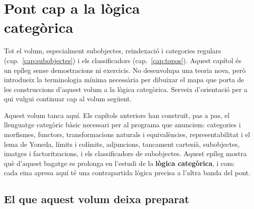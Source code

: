 \chapter[Pont cap a la lògica categòrica]{\texorpdfstring{Pont cap a la lògica\\ categòrica}{Pont cap a la lògica categòrica}}
\label{cap:pont}

\begin{objectius}
 Tot el volum, especialment subobjectes, reindexació i categories regulars (cap.~\ref{cap:subobjectes}) i els classificadors (cap.~\ref{cap:topos}).
 Aquest capítol és un epíleg sense demostracions ni exercicis. No desenvolupa una teoria nova, però introdueix la terminologia mínima necessària per dibuixar el mapa que porta de les construccions d'aquest volum a la lògica categòrica. Serveix d'orientació per a qui vulgui continuar cap al volum següent.
\end{objectius}

Aquest volum tanca aquí. Els capítols anteriors han construït, pas a pas, el llenguatge categòric bàsic necessari per al programa que anunciem: categories i morfismes, functors, transformacions naturals i equivalències, representabilitat i el lema de Yoneda, límits i colímits, adjuncions, tancament cartesià, subobjectes, imatges i factoritzacions, i els classificadors de subobjectes. Aquest epíleg mostra què d'aquest bagatge es prolonga en l'estudi de la \textbf{lògica categòrica}, i com: cada eina apresa aquí té una contrapartida lògica precisa a l'altra banda del pont.

\section{El que aquest volum deixa preparat}

